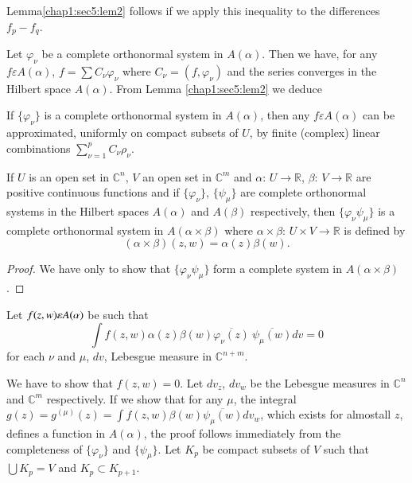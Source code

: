 Lemma\pageoriginale \ref{chap1:sec5:lem2} follows if we apply this
inequality to the differences $f_p - f_q$. 

Let $\varphi_\nu$ be a complete orthonormal system in $A(\alpha)$. Then
we have, for any $f \varepsilon A (\alpha)$, $f = \sum C_\nu \varphi_\nu$
where $C_\nu  = (f, \varphi_\nu)$ and the series converges in the
Hilbert space $A(\alpha)$. From Lemma \ref{chap1:sec5:lem2} we deduce  
\begin{lemma}\label{chap1:sec5:lem3} %
  If $\{\varphi_\nu\}$ is a complete orthonormal system in
  $A(\alpha)$, then any $f \varepsilon A (\alpha)$ can be approximated,
  uniformly on compact subsets of $U$, by finite (complex) linear
  combinations $\sum\limits_{\nu = 1}^p  C_\nu \rho_\nu$. 
\end{lemma}

\begin{prop*} %
  If $U$ is an open set in $\mathbb{C}^n$, $V$ an open set in
  $\mathbb{C}^m$ and $\alpha$: $U \to \mathbb{R}$, $\beta$: $V \to
  \mathbb{R}$ are positive continuous functions and if
  $\{\varphi_\nu\}$, $\{\psi_\mu\}$ are complete orthonormal systems
  in the Hilbert spaces $A(\alpha)$ and $A (\beta)$ respectively, then
  $\{\varphi_\nu \psi_\mu \}$ is a complete orthonormal system in
  $A(\alpha \times \beta )$ where $\alpha \times \beta$: $U \times V
  \to \mathbb{R}$ is defined by 
  $$
  (\alpha \times \beta ) (z, w ) = \alpha (z) \beta (w).
  $$
\end{prop*}

\begin{proof}
  We have only to show that $\{\varphi_\nu \psi _\mu\}$ form a complete
  system in $A(\alpha \times \beta )$. 
\end{proof}

Let $f(z, w) \varepsilon A (\alpha \time \beta)$ be such that
$$
\int f(z, w) \alpha (z) \beta (w ) \overline{\varphi_\nu (z)} ~
\overline{\psi_\mu (w)} dv = 0 
$$
for each $\nu $ and $\mu$, $dv$, Lebesgue measure in $\mathbb{C}^{n+m}$.

We have to show that $f(z, w) = 0$. Let $dv_z$, $dv_w$ be the Lebesgue
measures in $\mathbb{C}^n$ and $\mathbb{C}^m$ respectively. If we show
that for any $\mu$, the integral $g(z) = g^{(\mu)}(z) = \int f(z, w)
\beta (w) \overline{\psi_\mu (w)} dv_w$, which exists for  almost\pageoriginale all
$z$, defines a function in $A(\alpha)$, the proof follows immediately
from the completeness of $\{ \varphi_\nu \}$ and $\{\psi _\mu\}$. Let
$K_p$ be compact subsets of $V$ such that $\bigcup K_p = V$ and $K_p
\subset K_{p+1}$. 

